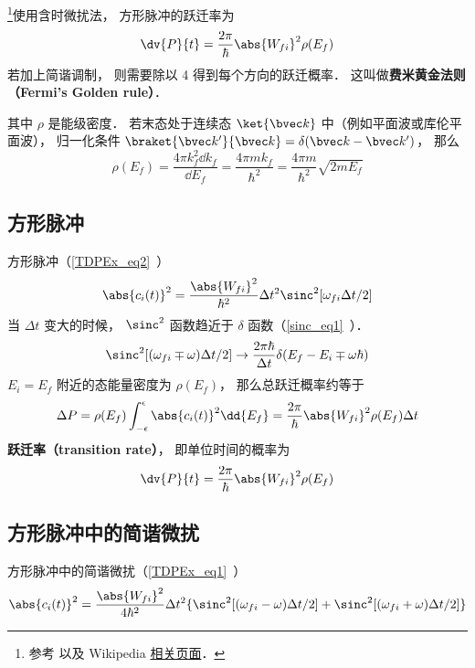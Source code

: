 

\footnote{参考 \cite{Bransden} 以及 Wikipedia \href{https://en.wikipedia.org/wiki/Fermi's_golden_rule}{相关页面}．}使用含时微扰法， 方形脉冲的跃迁率为
\begin{equation} %
\dv{P}{t} = \frac{2\pi}{\hbar} \abs{W_{fi}}^2\rho(E_f)
\end{equation}
若加上简谐调制， 则需要除以 4 得到每个方向的跃迁概率． 这叫做\textbf{费米黄金法则（Fermi's Golden rule）}．

其中 $\rho$ 是能级密度． 若末态处于连续态 $\ket{\bvec k}$ 中（例如平面波或库伦平面波）， 归一化条件 $\braket{\bvec k'}{\bvec k} = \delta(\bvec k - \bvec k')$， 那么
\begin{equation}
\rho(E_f) = \frac{4\pi k_f^2\dd{k_f}}{\dd{E_f}} = \frac{4\pi m k_f}{\hbar^2} = \frac{4\pi m}{\hbar^2}\sqrt{2mE_f}
\end{equation}

\subsection{方形脉冲}
方形脉冲（\autoref{TDPEx_eq2}~）
\begin{equation}
\abs{c_i(t)}^2 = \frac{\abs{W_{fi}}^2}{\hbar^2} \Delta t^2 \sinc^2[\omega_{fi}\Delta t/2]
\end{equation}
当 $\Delta t$ 变大的时候， $\sinc^2$ 函数趋近于 $\delta$ 函数（\autoref{sinc_eq1}~）．
\begin{equation}
\sinc^2[(\omega_{fi}\mp\omega)\Delta t/2] \to \frac{2\pi\hbar}{\Delta t}\delta(E_f - E_i \mp \omega\hbar)
\end{equation}
$E_i=E_f$ 附近的态能量密度为 $\rho(E_f)$， 那么总跃迁概率约等于
\begin{equation}
\Delta P = \rho(E_f)\int_{-\epsilon}^{\epsilon}\abs{c_i(t)}^2 \dd{E_f}
= \frac{2\pi}{\hbar} \abs{W_{fi}}^2\rho(E_f)\Delta t
\end{equation}
\textbf{跃迁率（transition rate）}， 即单位时间的概率为
\begin{equation}
\dv{P}{t} = \frac{2\pi}{\hbar} \abs{W_{fi}}^2\rho(E_f)
\end{equation}

\subsection{方形脉冲中的简谐微扰}
方形脉冲中的简谐微扰（\autoref{TDPEx_eq1}~）
\begin{equation}
\abs{c_i(t)}^2 = \frac{\abs{W_{fi}}^2}{4\hbar^2} \Delta t^2 \{\sinc^2[(\omega_{fi}-\omega)\Delta t/2] + \sinc^2[(\omega_{fi}+\omega)\Delta t/2]\}
\end{equation}

